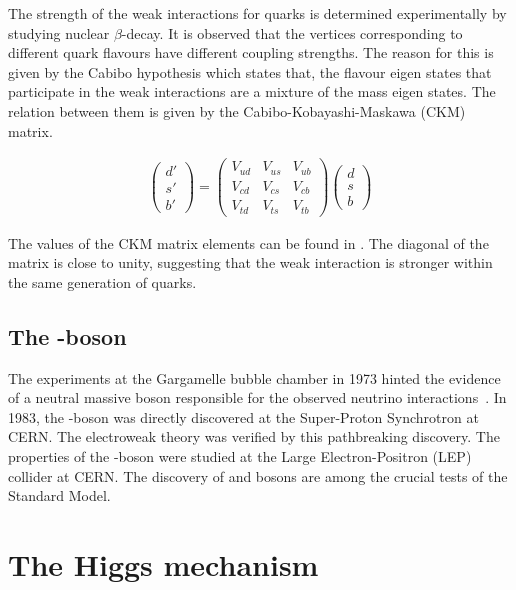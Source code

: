 The strength of the weak interactions for quarks is determined experimentally by studying
nuclear $\beta$-decay. It is observed that the vertices corresponding to different quark
flavours have different coupling strengths. The reason for this is given by the Cabibo
hypothesis which states that, the flavour eigen states that participate in the weak interactions
are a mixture of the mass eigen states. The relation between them is given by the 
Cabibo-Kobayashi-Maskawa (CKM) matrix. 

\begin{align*}
    \begin{pmatrix} d' \\ s' \\ b'\end{pmatrix}
     = \begin{pmatrix} V_{ud} & V_{us} & V_{ub} \\
                       V_{cd} & V_{cs} & V_{cb} \\
                       V_{td} & V_{ts} & V_{tb}
    \end{pmatrix} \begin{pmatrix} d \\ s \\ b\end{pmatrix}
\end{align*}

The values of the CKM matrix elements can be found in \cite{pdg2024}. The diagonal
of the matrix is close to unity, suggesting that the weak interaction is stronger within
the same generation of quarks. 

\subsection{The \PZ-boson}
The experiments at the Gargamelle bubble chamber in 1973 hinted the evidence of a neutral
massive boson responsible for the observed neutrino interactions~\cite{HASERT1973138}. In 1983, the \PZ-boson
was directly discovered at the Super-Proton Synchrotron at CERN. The electroweak theory
was verified by this pathbreaking discovery. The properties of the \PZ-boson were
studied at the Large Electron-Positron (LEP) collider at CERN. The discovery of \PZ and \PW 
bosons are among the crucial tests of the Standard Model. 






\section{The Higgs mechanism}




















